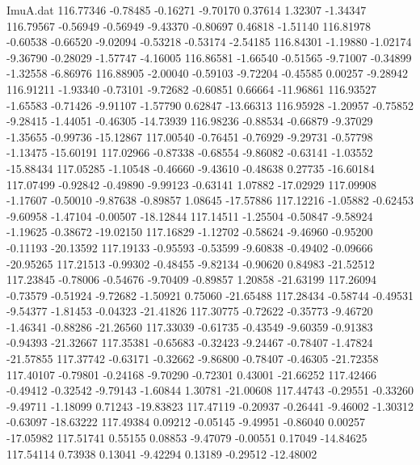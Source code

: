 \begin{filecontents}{ImuA.dat}
 116.77346   -0.78485   -0.16271   -9.70170    0.37614    1.32307   -1.34347
 116.79567   -0.56949   -0.56949   -9.43370   -0.80697    0.46818   -1.51140
 116.81978   -0.60538   -0.66520   -9.02094   -0.53218   -0.53174   -2.54185
 116.84301   -1.19880   -1.02174   -9.36790   -0.28029   -1.57747   -4.16005
 116.86581   -1.66540   -0.51565   -9.71007   -0.34899   -1.32558   -6.86976
 116.88905   -2.00040   -0.59103   -9.72204   -0.45585    0.00257   -9.28942
 116.91211   -1.93340   -0.73101   -9.72682   -0.60851    0.66664  -11.96861
 116.93527   -1.65583   -0.71426   -9.91107   -1.57790    0.62847  -13.66313
 116.95928   -1.20957   -0.75852   -9.28415   -1.44051   -0.46305  -14.73939
 116.98236   -0.88534   -0.66879   -9.37029   -1.35655   -0.99736  -15.12867
 117.00540   -0.76451   -0.76929   -9.29731   -0.57798   -1.13475  -15.60191
 117.02966   -0.87338   -0.68554   -9.86082   -0.63141   -1.03552  -15.88434
 117.05285   -1.10548   -0.46660   -9.43610   -0.48638    0.27735  -16.60184
 117.07499   -0.92842   -0.49890   -9.99123   -0.63141    1.07882  -17.02929
 117.09908   -1.17607   -0.50010   -9.87638   -0.89857    1.08645  -17.57886
 117.12216   -1.05882   -0.62453   -9.60958   -1.47104   -0.00507  -18.12844
 117.14511   -1.25504   -0.50847   -9.58924   -1.19625   -0.38672  -19.02150
 117.16829   -1.12702   -0.58624   -9.46960   -0.95200   -0.11193  -20.13592
 117.19133   -0.95593   -0.53599   -9.60838   -0.49402   -0.09666  -20.95265
 117.21513   -0.99302   -0.48455   -9.82134   -0.90620    0.84983  -21.52512
 117.23845   -0.78006   -0.54676   -9.70409   -0.89857    1.20858  -21.63199
 117.26094   -0.73579   -0.51924   -9.72682   -1.50921    0.75060  -21.65488
 117.28434   -0.58744   -0.49531   -9.54377   -1.81453   -0.04323  -21.41826
 117.30775   -0.72622   -0.35773   -9.46720   -1.46341   -0.88286  -21.26560
 117.33039   -0.61735   -0.43549   -9.60359   -0.91383   -0.94393  -21.32667
 117.35381   -0.65683   -0.32423   -9.24467   -0.78407   -1.47824  -21.57855
 117.37742   -0.63171   -0.32662   -9.86800   -0.78407   -0.46305  -21.72358
 117.40107   -0.79801   -0.24168   -9.70290   -0.72301    0.43001  -21.66252
 117.42466   -0.49412   -0.32542   -9.79143   -1.60844    1.30781  -21.00608
 117.44743   -0.29551   -0.33260   -9.49711   -1.18099    0.71243  -19.83823
 117.47119   -0.20937   -0.26441   -9.46002   -1.30312   -0.63097  -18.63222
 117.49384    0.09212   -0.05145   -9.49951   -0.86040    0.00257  -17.05982
 117.51741    0.55155    0.08853   -9.47079   -0.00551    0.17049  -14.84625
 117.54114    0.73938    0.13041   -9.42294    0.13189   -0.29512  -12.48002

\end{filecontents}
